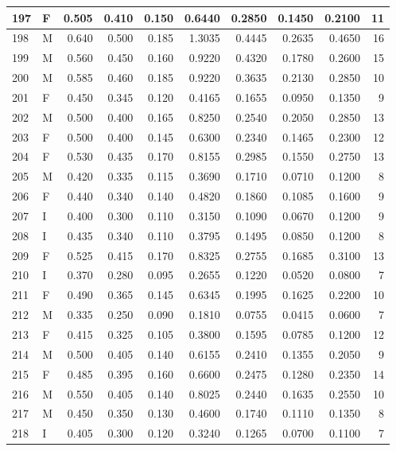 \documentclass[9pt,twocolumn,twoside,]{pnas-new}
\begin{document}
\begin{tabular}{l|l|r|r|r|r|r|r|r|r}
\hline
197 & F & 0.505 & 0.410 & 0.150 & 0.6440 & 0.2850 & 0.1450 & 0.2100 & 11\\
\hline
198 & M & 0.640 & 0.500 & 0.185 & 1.3035 & 0.4445 & 0.2635 & 0.4650 & 16\\
\hline
199 & M & 0.560 & 0.450 & 0.160 & 0.9220 & 0.4320 & 0.1780 & 0.2600 & 15\\
\hline
200 & M & 0.585 & 0.460 & 0.185 & 0.9220 & 0.3635 & 0.2130 & 0.2850 & 10\\
\hline
201 & F & 0.450 & 0.345 & 0.120 & 0.4165 & 0.1655 & 0.0950 & 0.1350 & 9\\
\hline
202 & M & 0.500 & 0.400 & 0.165 & 0.8250 & 0.2540 & 0.2050 & 0.2850 & 13\\
\hline
203 & F & 0.500 & 0.400 & 0.145 & 0.6300 & 0.2340 & 0.1465 & 0.2300 & 12\\
\hline
204 & F & 0.530 & 0.435 & 0.170 & 0.8155 & 0.2985 & 0.1550 & 0.2750 & 13\\
\hline
205 & M & 0.420 & 0.335 & 0.115 & 0.3690 & 0.1710 & 0.0710 & 0.1200 & 8\\
\hline
206 & F & 0.440 & 0.340 & 0.140 & 0.4820 & 0.1860 & 0.1085 & 0.1600 & 9\\
\hline
207 & I & 0.400 & 0.300 & 0.110 & 0.3150 & 0.1090 & 0.0670 & 0.1200 & 9\\
\hline
208 & I & 0.435 & 0.340 & 0.110 & 0.3795 & 0.1495 & 0.0850 & 0.1200 & 8\\
\hline
209 & F & 0.525 & 0.415 & 0.170 & 0.8325 & 0.2755 & 0.1685 & 0.3100 & 13\\
\hline
210 & I & 0.370 & 0.280 & 0.095 & 0.2655 & 0.1220 & 0.0520 & 0.0800 & 7\\
\hline
211 & F & 0.490 & 0.365 & 0.145 & 0.6345 & 0.1995 & 0.1625 & 0.2200 & 10\\
\hline
212 & M & 0.335 & 0.250 & 0.090 & 0.1810 & 0.0755 & 0.0415 & 0.0600 & 7\\
\hline
213 & F & 0.415 & 0.325 & 0.105 & 0.3800 & 0.1595 & 0.0785 & 0.1200 & 12\\
\hline
214 & M & 0.500 & 0.405 & 0.140 & 0.6155 & 0.2410 & 0.1355 & 0.2050 & 9\\
\hline
215 & F & 0.485 & 0.395 & 0.160 & 0.6600 & 0.2475 & 0.1280 & 0.2350 & 14\\
\hline
216 & M & 0.550 & 0.405 & 0.140 & 0.8025 & 0.2440 & 0.1635 & 0.2550 & 10\\
\hline
217 & M & 0.450 & 0.350 & 0.130 & 0.4600 & 0.1740 & 0.1110 & 0.1350 & 8\\
\hline
218 & I & 0.405 & 0.300 & 0.120 & 0.3240 & 0.1265 & 0.0700 & 0.1100 & 7\\

\end{tabular}
\end{document}
